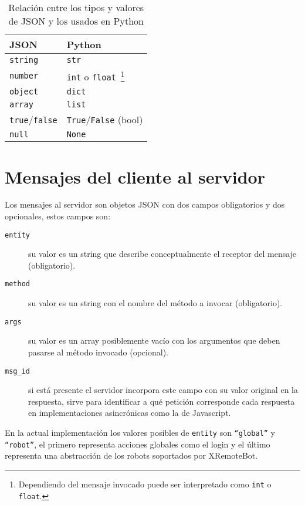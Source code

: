 \begin{table}
    \centering
    \begin{tabu}{l|l}
        JSON & Python \\
        \hline
        \texttt{string} & \texttt{str} \\
        \texttt{number} & \texttt{int} o \texttt{float}~\footnote{Dependiendo
        del mensaje invocado
        puede ser interpretado como \texttt{int} o \texttt{float}.}\\
        \texttt{object} & \texttt{dict} \\
        \texttt{array}  & \texttt{list} \\
        \texttt{true}/\texttt{false} & \texttt{True}/\texttt{False} (bool) \\
        \texttt{null} & \texttt{None} \\
    \end{tabu}
    \caption{Relación entre los tipos y valores de JSON y los usados en
    Python}
    \label{tbl:rel_json_python}
\end{table}

\section{Mensajes del cliente al servidor}

Los mensajes al servidor son objetos JSON con dos campos obligatorios y dos
opcionales, estos campos son:

\begin{description}
    \item[\texttt{entity}] su valor es un string que describe conceptualmente
        el receptor del mensaje (obligatorio).
    \item[\texttt{method}] su valor es un string con el nombre del método a
        invocar (obligatorio).
    \item[\texttt{args}] su valor es un array posiblemente vacío con los
        argumentos que deben pasarse al método invocado (opcional).
    \item[\texttt{msg\_id}] si está presente el servidor incorpora este
        campo con su valor original en la respuesta, sirve para identificar a
        qué petición
        corresponde cada respuesta en implementaciones asincrónicas
        como la de Javascript.
\end{description}

En la actual implementación los valores posibles de \texttt{entity} son
\texttt{``global''} y \texttt{``robot''}, el primero
representa acciones globales como el login y el último representa una
abstracción de los robots soportados por XRemoteBot.

